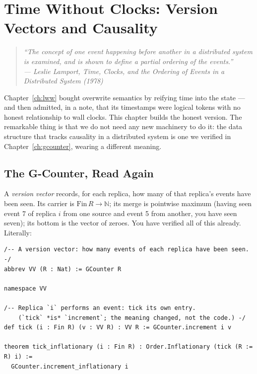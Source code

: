 \documentclass[12pt, a4paper, openright]{book}
\theoremstyle{thmstyle}
\theoremstyle{defstyle}
\begin{document}
\chapter{Time Without Clocks: Version Vectors and Causality}
\label{ch:vv}

\begin{quote}
  \itshape
  ``The concept of one event happening before another in a distributed
  system is examined, and is shown to define a partial ordering of the
  events.''\\
  --- Leslie Lamport, \emph{Time, Clocks, and the Ordering of Events in a
  Distributed System} (1978)
\end{quote}

Chapter~\ref{ch:lww} bought overwrite semantics by reifying time into
the state --- and then admitted, in a note, that its timestamps were
logical tokens with no honest relationship to wall clocks. This chapter
builds the honest version. The remarkable thing is that we do not need
any new machinery to do it: the data structure that tracks causality in
a distributed system is one we verified in Chapter~\ref{ch:gcounter},
wearing a different meaning.

\section{The G-Counter, Read Again}

A \emph{version vector} records, for each replica, how many of that
replica's events have been seen. Its carrier is $\mathrm{Fin}\,R \to
\mathbb{N}$; its merge is pointwise maximum (having seen event 7 of
replica $i$ from one source and event 5 from another, you have seen
seven); its bottom is the vector of zeroes. You have verified all of
this already. Literally:

\begin{verbatim}
/-- A version vector: how many events of each replica have been seen. -/
abbrev VV (R : Nat) := GCounter R

namespace VV

/-- Replica `i` performs an event: tick its own entry.
    (`tick` *is* `increment`; the meaning changed, not the code.) -/
def tick (i : Fin R) (v : VV R) : VV R := GCounter.increment i v

theorem tick_inflationary (i : Fin R) : Order.Inflationary (tick (R := R) i) :=
  GCounter.increment_inflationary i
\end{verbatim}
\end{document}
